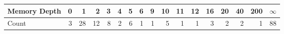 \begin{tabular}{lrrrrrrrrrrrrrrrr}
\toprule
Memory Depth &   0   &   1   &   2   &   3   &   4   &   5   &   6   &   9   &   10  &   11  &   12  &   16  &   20  &   40  &   200 &  \(\infty\)   \\
\midrule
Count &     3 &    28 &    12 &     8 &     2 &     6 &     1 &     1 &     5 &     1 &     1 &     3 &     2 &     2 &     1 &    88 \\
\bottomrule
\end{tabular}
